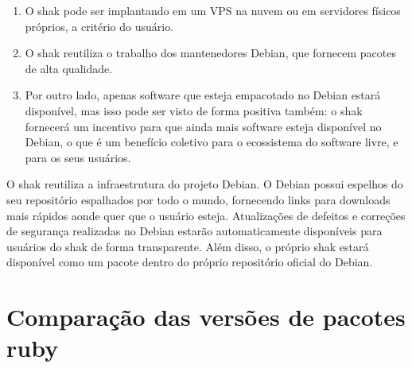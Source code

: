 \begin{anexosenv}
\begin{enumerate}
  \item O shak pode ser implantando em um VPS na nuvem ou em servidores físicos
  próprios, a critério do usuário.
  \item O shak reutiliza o trabalho dos mantenedores Debian, que fornecem pacotes
  de alta qualidade.
  \item Por outro lado, apenas software que esteja empacotado no Debian estará
  disponível, mas isso pode ser visto de forma positiva também: o shak
  fornecerá um incentivo para que ainda mais software esteja disponível no
  Debian, o que é um benefício coletivo para o ecossistema do software livre, e
  para os seus usuários.
\end{enumerate}

O shak reutiliza a infraestrutura do projeto Debian. O Debian possui espelhos 
do seu repositório espalhados por todo o mundo, fornecendo links para 
downloads mais rápidos aonde quer que o usuário esteja. Atualizações de 
defeitos e correções de segurança realizadas no Debian estarão automaticamente 
disponíveis para usuários do shak de forma transparente. Além disso, o 
próprio shak estará disponível como um pacote dentro do próprio repositório oficial do Debian.

\chapter{Comparação das versões de pacotes ruby}


\end{anexosenv}
